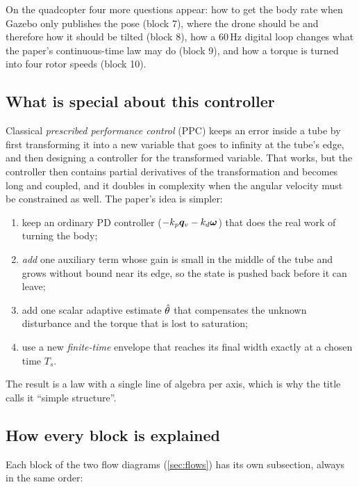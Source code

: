On the quadcopter four more questions appear: how to get the body rate when Gazebo only publishes the pose
(block 7), where the drone should be and therefore how it should be tilted (block 8), how a 60\,Hz digital loop
changes what the paper's continuous-time law may do (block 9), and how a torque is turned into four rotor speeds
(block 10).

\subsection{What is special about this controller}

Classical \emph{prescribed performance control} (PPC) keeps an error inside a tube by first transforming it into a
new variable that goes to infinity at the tube's edge, and then designing a controller for the transformed variable.
That works, but the controller then contains partial derivatives of the transformation and becomes long and coupled,
and it doubles in complexity when the angular velocity must be constrained as well. The paper's idea is simpler:
\begin{enumerate}[leftmargin=*]
  \item keep an ordinary PD controller ($-k_p\bm{q}_v-k_d\bm{\omega}$) that does the real work of turning the body;
  \item \emph{add} one auxiliary term whose gain is small in the middle of the tube and grows without bound near its
        edge, so the state is pushed back before it can leave;
  \item add one scalar adaptive estimate $\hat{\theta}$ that compensates the unknown disturbance and the torque that is lost
        to saturation;
  \item use a new \emph{finite-time} envelope that reaches its final width exactly at a chosen time $T_s$.
\end{enumerate}
The result is a law with a single line of algebra per axis, which is why the title calls it ``simple structure''.

\subsection{How every block is explained}

Each block of the two flow diagrams (\cref{sec:flows}) has its own subsection, always in the same order:

